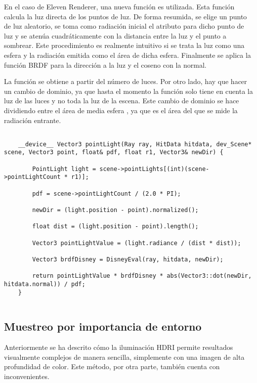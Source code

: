 En el caso de Eleven Renderer, una nueva función  es utilizada. Esta función calcula la luz directa de los puntos de luz. De forma resumida, se elige un punto de luz aleatorio, se toma como radiación inicial el atributo  para dicho punto de luz y se atenúa cuadráticamente con la distancia entre la luz y el punto a sombrear. Este procedimiento es realmente intuitivo si se trata la luz como una esfera y la radiación emitida como el área de dicha esfera. Finalmente se aplica la función BRDF para la dirección a la luz y el coseno con la normal. 

La función  se obtiene a partir del número de luces. Por otro lado, hay que hacer un cambio de dominio, ya que hasta el momento la función  solo tiene en cuenta la luz de las luces y no toda la luz de la escena. Este cambio de dominio se hace dividiendo entre el área de media esfera , ya que es el área del que se mide la radiación entrante.

\begin{lstlisting}
	
	__device__ Vector3 pointLight(Ray ray, HitData hitdata, dev_Scene* scene, Vector3 point, float& pdf, float r1, Vector3& newDir) {

		PointLight light = scene->pointLights[(int)(scene->pointLightCount * r1)];

		pdf = scene->pointLightCount / (2.0 * PI);

		newDir = (light.position - point).normalized();

		float dist = (light.position - point).length();

		Vector3 pointLightValue = (light.radiance / (dist * dist));

		Vector3 brdfDisney = DisneyEval(ray, hitdata, newDir);

		return pointLightValue * brdfDisney * abs(Vector3::dot(newDir, hitdata.normal)) / pdf;
	}
	
\end{lstlisting}


\subsection{Muestreo por importancia de entorno}
	
Anteriormente se ha descrito cómo la iluminación HDRI permite resultados visualmente complejos de manera sencilla, simplemente con una imagen de alta profundidad de color. Este método, por otra parte, también cuenta con inconvenientes. 

